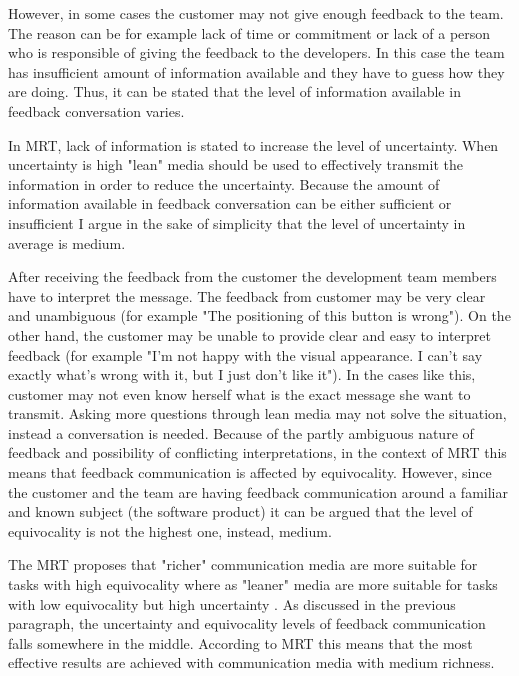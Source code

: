 \documentclass[english,12pt,a4paper,pdftex]{article}
\begin{document}
However, in some cases the customer may not give enough feedback to the team. The reason can be for example lack of time or commitment or lack of a person who is responsible of giving the feedback to the developers. In this case the team has insufficient amount of information available and they have to guess how they are doing. Thus, it can be stated that the level of information available in feedback conversation varies. 

In \ac{MRT}, lack of information is stated to increase the level of uncertainty. When uncertainty is high "lean" media should be used to effectively transmit the information in order to reduce the uncertainty. Because the amount of information available in feedback conversation can be either sufficient or insufficient I argue in the sake of simplicity that the level of uncertainty in average is medium.

After receiving the feedback from the customer the development team members have to interpret the message. The feedback from customer may be very clear and unambiguous (for example "The positioning of this button is wrong"). On the other hand, the customer may be unable to provide clear and easy to interpret feedback (for example "I'm not happy with the visual appearance. I can't say exactly what's wrong with it, but I just don't like it"). In the cases like this, customer may not even know herself what is the exact message she want to transmit. Asking more questions through lean media may not solve the situation, instead a conversation is needed. Because of the partly ambiguous nature of feedback and possibility of conflicting interpretations, in the context of \ac{MRT} this means that feedback communication is affected by equivocality. However, since the customer and the team are having feedback communication around a familiar and known subject (the software product) it can be argued that the level of equivocality is not the highest one, instead, medium.

The \ac{MRT} proposes that "richer" communication media are more suitable for tasks with high equivocality where as "leaner" media are more suitable for tasks with low equivocality but high uncertainty \citep{daft1986}. As discussed in the previous paragraph, the uncertainty and equivocality levels of feedback communication falls somewhere in the middle. According to \ac{MRT} this means that the most effective results are achieved with communication media with medium richness.

\end{document}
